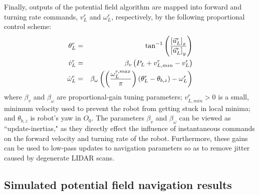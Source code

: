 			Finally, outputs of the potential field algorithm are mapped into forward and turning rate commands, ${v}_{L}^{r}$ and $\omega_{L}^{r}$, respectively, by the following proportional control scheme:
				\begin{eqnarray}
					\theta_{L}^{r} 			&=& \tan^{-1}\left( \frac{ \left[\vec{u}^{r}_{L}\right]_{x} }{ \left[\vec{u}^{r}_{L}\right]_{y} } \right) \nonumber\\
					\dot{v}_{L}^{r} 		&=& \beta_{v} \left( P_{L} + v_{L,min}^{r} - v_{L}^{r} \right) \nonumber \\
					\dot{\omega}_{L}^{r} 	&=& \beta_{\omega} \left( \left( \frac{ \omega_{L}^{r,max} }{\pi} \right) \left(  \theta_{L}^{r} - \theta_{b,z} \right) - \omega_{L}^{r} \right)
				\end{eqnarray}
			where $\beta_{v}$ and $\beta_{\omega}$ are proportional-gain tuning parameters; $v_{L,min}^{r}>0$ is a small, minimum velocity used to prevent the robot from getting stuck in local minima; and $\theta_{b,z}$ is robot's yaw in $O_{0}$. The parameters $\beta_{v}$ and $\beta_{\omega}$ can be viewed as ``update-inertias," as they directly effect the influence of instantaneous commands on the forward velocity and turning rate of the robot. Furthermore, these gains can be used to low-pass updates to navigation parameters so as to remove jitter caused by degenerate LIDAR scans.


		\subsection{Simulated potential field navigation results}

